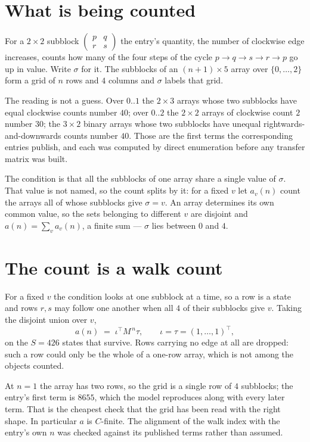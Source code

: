 \documentclass[11pt,a4paper]{article}
\theoremstyle{plain}
\theoremstyle{definition}
\begin{document}
\section{What is being counted}

For a $2\times2$ subblock $\begin{pmatrix}p&q\\r&s\end{pmatrix}$ the
entry's quantity, the number of clockwise edge increases, counts how many of the four steps of the cycle $p\to q\to s\to r\to p$ go up in value. Write $\sigma$ for it. The subblocks of an
$(n+1)\times5$ array over $\{0,\dots,2\}$ form a grid of $n$ rows and $4$
columns and $\sigma$ labels that grid.

The reading is not a guess. Over $0..1$ the $2\times3$ arrays whose two subblocks have equal
clockwise counts number $40$; over $0..2$ the $2\times2$ arrays of clockwise count $2$ number
$30$; the $3\times2$ binary arrays whose two subblocks have unequal rightwards-and-downwards
counts number $40$. Those are the first terms the corresponding entries publish, and each was
computed by direct enumeration before any transfer matrix was built.

The condition is that all the subblocks of one array share a single value of $\sigma$. That
value is not named, so the count splits by it: for a fixed $v$ let $a_v(n)$ count the arrays all
of whose subblocks give $\sigma=v$. An array determines its own common value, so the sets
belonging to different $v$ are disjoint and $a(n)=\sum_v a_v(n)$, a finite sum --- $\sigma$
lies between $0$ and $4$.

\section{The count is a walk count}

For a fixed $v$ the condition looks at one subblock at a time, so a row is
a state and rows $r,s$ may follow one another when all $4$ of their subblocks give $v$.
Taking the disjoint union over $v$,
\[
a(n)\;=\;\iota^{\!\top}M^{\,n}\tau,\qquad\iota=\tau=(1,\dots,1)^{\!\top},
\]
on the $S=426$ states that survive. Rows carrying no edge at all are dropped: such a row could
only be the whole of a one-row array, which is not among the objects counted.

At $n=1$ the array has two rows, so the grid is a single row of $4$
subblocks; the entry's first term is $8655$, which the model
reproduces along with every later term. That is the cheapest check that the grid has been read
with the right shape.
In particular $a$ is $C$-finite. The alignment of the walk index with the entry's own $n$ was
checked against its published terms rather than assumed.
\end{document}
